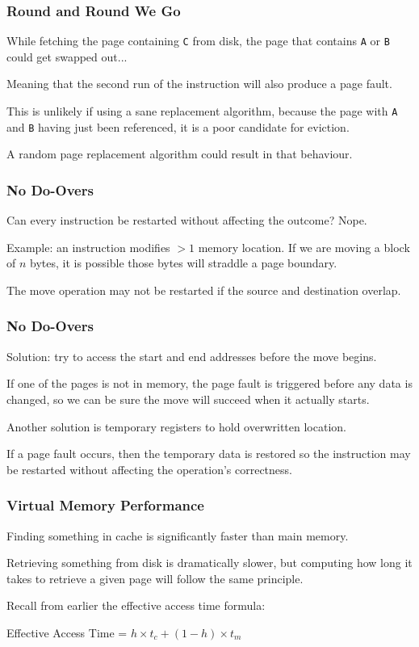 \begin{frame}
\frametitle{Round and Round We Go}

While fetching the page containing \texttt{C} from disk, the page that contains \texttt{A} or \texttt{B} could get swapped out...

Meaning that the second run of the instruction will also produce a page fault. 

This is unlikely if using a sane replacement algorithm, because the page with \texttt{A} and \texttt{B} having just been referenced, it is a poor candidate for eviction. 

A random page replacement algorithm could result in that behaviour.

\end{frame}

\begin{frame}
\frametitle{No Do-Overs}

Can every instruction be restarted without affecting the outcome? Nope.

Example: an instruction modifies $> 1$ memory location. If we are moving a block of $n$ bytes, it is possible those bytes will straddle a page boundary.

The move operation may not be restarted if the source and destination overlap.

\end{frame}

\begin{frame}
\frametitle{No Do-Overs}

Solution: try to access the start and end addresses before the move begins. 

If one of the pages is not in memory, the page fault is triggered before any data is changed, so we can be sure the move will succeed when it actually starts. 

Another solution is temporary registers to hold overwritten location. 

If a page fault occurs, then the temporary data is restored so the instruction may be restarted without affecting the operation's correctness.

\end{frame}

\begin{frame}
\frametitle{Virtual Memory Performance}

Finding something in cache is significantly faster than main memory. 

Retrieving something from disk is dramatically slower, but computing how long it takes to retrieve a given page will follow the same principle. 

Recall from earlier the effective access time formula:

\begin{center}
	Effective Access Time = $ h \times t_{c} + (1 - h) \times t_{m}$
\end{center}


\end{frame}

